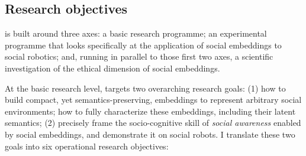 \subsection{Research objectives}

\project is built around three axes: a basic research programme; an experimental
programme that looks specifically at the application of social embeddings to
social robotics; and, running in parallel to those first two axes, a scientific
investigation of the ethical dimension of social embeddings.

At the basic research level, \project targets two overarching research goals:
(1) how to build compact, yet semantics-preserving, embeddings to represent
arbitrary social environments; how to fully characterize these embeddings,
including their latent semantics; (2) precisely frame the socio-cognitive skill
of \emph{social awareness} enabled by social embeddings, and demonstrate it on
social robots.  I translate these two goals into six operational research
objectives:


